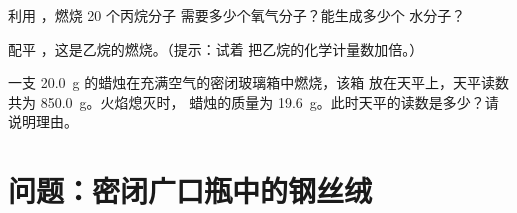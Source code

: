 \begin{exercise}[$\star\star$]\label{exo:g8:balanced-equations:10}
利用 ，燃烧 20 个丙烷分子
需要多少个氧气分子？能生成多少个
水分子？
\end{exercise}

\begin{exercise}[$\star\star\star$]\label{exo:g8:balanced-equations:11}
配平 ，这是乙烷的燃烧。（提示：试着 %
把乙烷的化学计量数加倍。）
\end{exercise}

\begin{exercise}[$\star\star\star$]\label{exo:g8:balanced-equations:12}
一支 \qty{20.0}{g} 的蜡烛在充满空气的密闭玻璃箱中燃烧，该箱
放在天平上，天平读数共为 \qty{850.0}{g}。火焰熄灭时，
蜡烛的质量为 \qty{19.6}{g}。此时天平的读数是多少？请说明理由。
\end{exercise}

\section{问题：密闭广口瓶中的钢丝绒}


